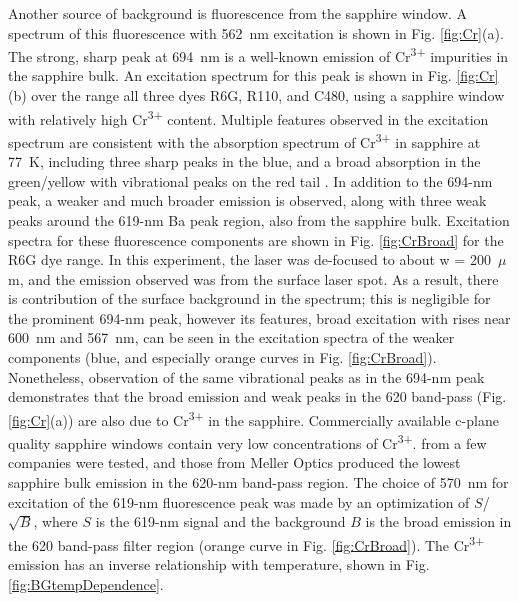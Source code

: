 Another source of background is fluorescence from the sapphire window.  A spectrum of this fluorescence with 562~nm excitation is shown in Fig. \ref{fig:Cr}(a).  The strong, sharp peak at 694~nm is a well-known emission of Cr\textsuperscript{3+} impurities in the sapphire bulk.  An excitation spectrum for this peak is shown in Fig. \ref{fig:Cr}(b) over the range all three dyes R6G, R110, and C480, using a sapphire window with relatively high Cr\textsuperscript{3+} content.  Multiple features observed in the excitation spectrum are consistent with the absorption spectrum of Cr\textsuperscript{3+} in sapphire at 77~K, including three sharp peaks in the blue, and a broad absorption in the green/yellow with vibrational peaks on the red tail \cite{SapphireFord,SapphireMcclure}.  In addition to the 694-nm peak, a weaker and much broader emission is observed, along with three weak peaks around the 619-nm Ba peak region, also from the sapphire bulk.  Excitation spectra for these fluorescence components are shown in Fig. \ref{fig:CrBroad} for the R6G dye range.  In this experiment, the laser was de-focused to about w = 200~$\mu$m, and the emission observed was from the surface laser spot.  As a result, there is contribution of the surface background in the spectrum; this is negligible for the prominent 694-nm peak, however its features, broad excitation with rises near 600~nm and 567~nm, can be seen in the excitation spectra of the weaker components (blue, and especially orange curves in Fig. \ref{fig:CrBroad}).  Nonetheless, observation of the same vibrational peaks as in the 694-nm peak demonstrates that the broad emission and weak peaks in the 620 band-pass (Fig. \ref{fig:Cr}(a)) are also due to Cr\textsuperscript{3+} in the sapphire.  Commercially available c-plane quality sapphire windows contain very low concentrations of Cr\textsuperscript{3+}.   from a few companies were tested, and those from Meller Optics produced the lowest sapphire bulk emission in the 620-nm band-pass region.  The choice of 570~nm for excitation of the 619-nm fluorescence peak was made by an optimization of $S$/$\sqrt{B}$, where $S$ is the 619-nm signal and the background $B$ is the broad emission in the 620 band-pass filter region (orange curve in Fig. \ref{fig:CrBroad}).  The Cr\textsuperscript{3+} emission has an inverse relationship with temperature, shown in Fig. \ref{fig:BGtempDependence}.



